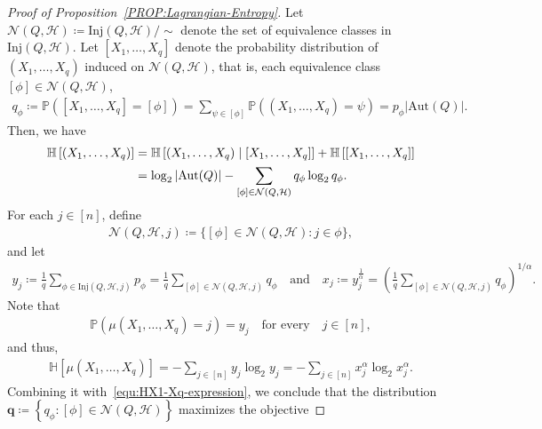 \documentclass[11pt,a4paper]{article}
\begin{document}
\begin{proof}[Proof of Proposition~\ref{PROP:Lagrangian-Entropy}]
    Let $\mathcal{N}(Q,\mathcal{H}) \coloneqq \mathrm{Inj}(Q,\mathcal{H})/\sim$ denote the set of equivalence classes in $\mathrm{Inj}(Q,\mathcal{H})$. 
    Let $[X_1, \ldots, X_q]$ denote the probability distribution of $(X_1, \ldots, X_q)$ induced on $\mathcal{N}(Q,\mathcal{H})$, that is, each equivalence class $[\phi] \in \mathcal{N}(Q,\mathcal{H})$, 
    \begin{align}\label{equ:def-q-phi}
        q_{\phi}
        \coloneqq \mathbb{P}\left([X_1, \ldots, X_q] = [\phi] \right)
        = \sum_{\psi \in [\phi]} \mathbb{P}\left((X_1, \ldots, X_q) = \psi\right) 
        = p_{\phi} |\mathrm{Aut}(Q)|. 
    \end{align}
    Then, we have  
    \begin{align}\label{equ:HX1-Xq-expression}
        \mathbb{H}\left[ (X_1, \ldots, X_q) \right]
        & = \mathbb{H}\left[ (X_1, \ldots, X_q) \mid [X_1, \ldots, X_q] \right] + \mathbb{H}\left[ [X_1, \ldots, X_q] \right] \notag \\
        & = \log_{2} |\mathrm{Aut}(Q)| - \sum_{[\phi] \in \mathcal{N}(Q,\mathcal{H})} q_{\phi} \log_{2} q_{\phi}. 
    \end{align}
    For each $j \in [n]$, define  
    \begin{align*}
        \mathcal{N}(Q, \mathcal{H}, j)
        \coloneqq \big\{  [\phi] \in \mathcal{N}(Q, \mathcal{H}) \colon j \in \phi \big\}, 
    \end{align*}
    and let 
    \begin{align}\label{equ:def-yj}
        y_j 
        \coloneqq \frac{1}{q} \sum_{\phi \in \mathrm{Inj}(Q,\mathcal{H}, j)}p_{\phi}
        = \frac{1}{q} \sum_{[\phi] \in \mathcal{N}(Q, \mathcal{H}, j)} q_{\phi}
        \quad\text{and}\quad 
        x_{j}
        \coloneqq  y_j^{\frac{1}{\alpha}}
        = \left(\frac{1}{q} \sum_{[\phi] \in \mathcal{N}(Q, \mathcal{H}, j)} q_{\phi}\right)^{1/\alpha}.  
    \end{align}
    Note that 
    \begin{align*}
        \mathbb{P}\left( \mu(X_1, \ldots, X_q) = j \right)
        = y_j
        \quad\text{for every}\quad j \in [n],  
    \end{align*}
    and thus, 
    \begin{align*}
        \mathbb{H}\left[\mu(X_1, \ldots, X_q)\right]
        = - \sum_{j\in [n]} y_j \log_{2} y_j 
        = - \sum_{j \in [n]} x_j^{\alpha} \log_{2} x_j^{\alpha}. 
    \end{align*}
    Combining it with~\eqref{equ:HX1-Xq-expression}, we conclude that the distribution $\mathbf{q} \coloneqq \left\{ q_{\phi} \colon [\phi] \in \mathcal{N}(Q, \mathcal{H}) \right\}$ maximizes the objective 

\end{proof}
\end{document}
